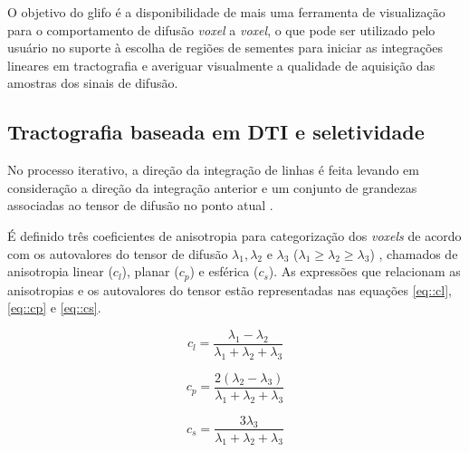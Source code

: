 \documentclass[
    12pt,                %
    oneside,            %
    a4paper,            %
    english,            %
    french,                %
    spanish,            %
    brazil                %
    ]{abntex2}
\begin{document}
O objetivo do glifo é a disponibilidade de mais uma ferramenta de visualização para o comportamento de difusão \textit{voxel} a \textit{voxel}, o que pode ser utilizado pelo usuário no suporte à escolha de regiões de sementes para iniciar as integrações lineares em tractografia e averiguar visualmente a qualidade de aquisição das amostras dos sinais de difusão.


\subsection{Tractografia baseada em DTI e seletividade}
\label{ssec::tractografia_e_seletividade}









No processo iterativo, a direção da integração de linhas é feita levando em consideração a direção da integração anterior e um conjunto de grandezas associadas ao tensor de difusão no ponto atual \cite{Weinstein1999}.


É definido três coeficientes de anisotropia para categorização dos \textit{voxels} de acordo com os autovalores do tensor de difusão $\lambda_1, \lambda_2$ e $\lambda_3$ ($\lambda_1 \geq \lambda_2 \geq \lambda_3$) , chamados de anisotropia linear ($c_l$), planar ($c_p$) e esférica ($c_s$). As expressões que relacionam as anisotropias e os autovalores do tensor estão representadas nas equações \ref{eq::cl}, \ref{eq::cp} e \ref{eq::cs}.

\begin{equation}
\label{eq::cl}
    c_l = \frac{\lambda_1 - \lambda_2}{\lambda_1 + \lambda_2 + \lambda_3}
\end{equation}

\begin{equation}
\label{eq::cp}
    c_p = \frac{2(\lambda_2 - \lambda_3)}{\lambda_1 + \lambda_2 + \lambda_3}
\end{equation}

\begin{equation}
\label{eq::cs}
    c_s = \frac{3\lambda_3}{\lambda_1 + \lambda_2 + \lambda_3}
\end{equation}
\end{document}
